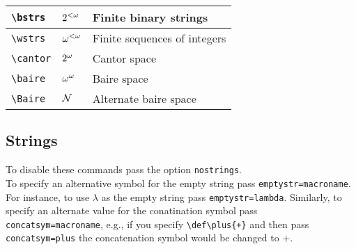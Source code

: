 \documentclass[leqno,11pt]{amsart}
\begin{document}
\begin{tabular}{l |  l | l}\toprule
	\verb=\bstrs=		       & \( 2^{<\omega}  \) & Finite binary strings        \\	\midrule
	\verb=\wstrs=                 & \( \omega^{<\omega}  \) & Finite sequences of integers \\ 	\midrule
	\verb=\cantor=                & \( 2^{\omega} \) & Cantor space		     \\    \midrule
	\verb=\baire=                 & \( \omega^{\omega}  \) & Baire space                  \\[6pt]
	\verb=\Baire=                 & \( \mathcal{N}  \) & Alternate baire space        \\
		\bottomrule
	\end{tabular}

\subsection{Strings}
To disable these commands pass the option \verb=nostrings=.\\

To specify an alternative symbol for the empty string pass \verb!emptystr=macroname!.  For instance, to use \( \lambda \) as the empty string pass \verb!emptystr=lambda!.  Similarly, to specify an alternate value for the conatination symbol pass \verb!concatsym=macroname!, e.g., if you specify \verb!\def\plus{+}! and then pass \verb!concatsym=plus! the concatenation symbol would be changed to \( + \).
\end{document}
